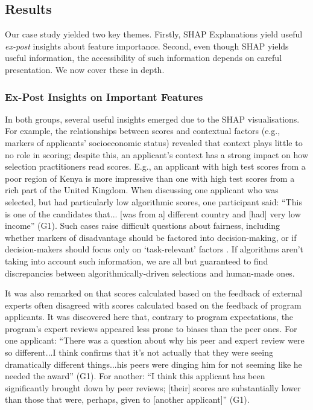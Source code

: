 \subsection{Results}\label{sec:cs_results}
Our case study yielded two key themes. Firstly, SHAP Explanations yield useful \emph{ex-post} insights about feature importance. Second, even though SHAP yields useful information, the accessibility of such information depends on careful presentation. We now cover these in depth.

\subsubsection{Ex-Post Insights on Important Features}
In both groups, several useful insights emerged due to the SHAP visualisations. For example, the relationships between scores and contextual factors (e.g., markers of applicants' socioeconomic status) revealed that context plays little to no role in scoring; despite this, an applicant's context has a strong impact on how selection practitioners read scores. E.g., an applicant with high test scores from a poor region of Kenya is more impressive than one with high test scores from a rich part of the United Kingdom. When discussing one applicant who was selected, but had particularly low algorithmic scores, one participant said: ``This is one of the candidates that... [was from a] different country and [had] very low income'' (G1). Such cases raise difficult questions about fairness, including whether markers of disadvantage should be factored into decision-making, or if decision-makers should focus only on `task-relevant' factors \cite{dwork_fairness_2012}. If algorithms aren't taking into account such information, we are all but guaranteed to find discrepancies between algorithmically-driven selections and human-made ones.

It was also remarked on that scores calculated based on the feedback of external experts often disagreed with scores calculated based on the feedback of program applicants. It was discovered here that, contrary to program expectations, the program's expert reviews appeared less prone to biases than the peer ones. For one applicant: ``There was a question about why his peer and expert review were so different...I think confirms that it's not actually that they were seeing dramatically different things...his peers were dinging him for not seeming like he needed the award'' (G1). For another: ``I think this applicant has been significantly brought down by peer reviews; [their] scores are substantially lower than those that were, perhaps, given to [another applicant]'' (G1).

